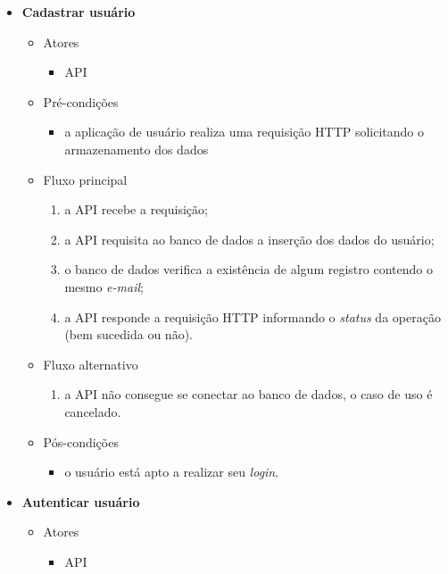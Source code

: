\begin{itemize}
		
	\item \textbf{Cadastrar usuário}

		\begin{itemize}
		    \item Atores
			    \begin{itemize}
			        \item API
			    \end{itemize}

		    \item Pré-condições
			    \begin{itemize}
			        \item a aplicação de usuário realiza uma requisição HTTP solicitando o armazenamento dos dados
			    \end{itemize}

		    \item Fluxo principal
			    \begin{enumerate}
			        \item a API recebe a requisição;
			        \item a API requisita ao banco de dados a inserção dos dados do usuário;
			        \item o banco de dados verifica a existência de algum registro contendo o mesmo \textit{e-mail}; 
        			\item a API responde a requisição HTTP informando o \textit{status} da operação (bem sucedida ou não).
			    \end{enumerate}
    
		    \item Fluxo alternativo
			    \begin{enumerate}
			        \item a API não consegue se conectar ao banco de dados, o caso de uso é cancelado.
			    \end{enumerate}
	
		    \item Pós-condições
			    \begin{itemize}
			       \item o usuário está apto a realizar seu \textit{login}.
			    \end{itemize}
		\end{itemize}

	\item \textbf{Autenticar usuário}

		\begin{itemize}
   			 \item Atores
			    \begin{itemize}
			        \item API
			    \end{itemize}


\end{itemize}
\end{itemize}
